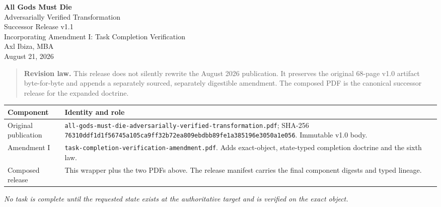\documentclass[11pt]{article}
\begin{document}
\begin{center}
\vspace*{1.0in}
{\Huge\bfseries All Gods Must Die\\[0.25em]}
{\LARGE Adversarially Verified Transformation\\[1.25em]}
{\Large Successor Release v1.1\\[0.5em]}
{\large Incorporating Amendment I: Task Completion Verification\\[2em]}
{\large Axl Ibiza, MBA\\[0.35em]}
{\normalsize August 21, 2026}
\end{center}

\vfill

\begin{quote}
\textbf{Revision law.} This release does not silently rewrite the August 2026 publication. It preserves the original 68-page v1.0 artifact byte-for-byte and appends a separately sourced, separately digestible amendment. The composed PDF is the canonical successor release for the expanded doctrine.
\end{quote}

\vspace{1em}

\begin{tabular}{@{}p{}p{}@{}}
\toprule
\textbf{Component} & \textbf{Identity and role} \\
\midrule
Original publication & \texttt{all-gods-must-die-adversarially-verified-transformation.pdf}; SHA-256 \texttt{76310ddf1d1f56745a105ca9ff32b72ea809ebdbb89fe1a385196e3050a1e056}. Immutable v1.0 body. \\
Amendment I & \texttt{task-completion-verification-amendment.pdf}. Adds exact-object, state-typed completion doctrine and the sixth law. \\
Composed release & This wrapper plus the two PDFs above. The release manifest carries the final component digests and typed lineage. \\
\bottomrule
\end{tabular}

\vfill

\begin{center}
\emph{No task is complete until the requested state exists at the authoritative target and is verified on the exact object.}
\end{center}

\clearpage


\end{document}
